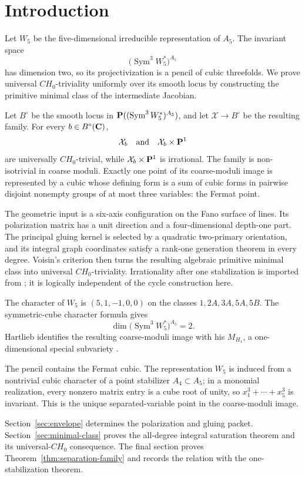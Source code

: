 \section{Introduction}

Let \(W_5\) be the five-dimensional irreducible representation of \(A_5\).
The invariant space
\[
 \bigl(\operatorname{Sym}^3W_5^*\bigr)^{A_5}
\]
has dimension two, so its projectivization is a pencil of cubic threefolds.
We prove universal \(CH_0\)-triviality uniformly over its smooth locus by
constructing the primitive minimal class of the intermediate Jacobian.

\begin{theorem}
\label{thm:separation-family}
%
%
Let \(B^\circ\) be the smooth locus in
\(\mathbf P((\operatorname{Sym}^3W_5^*)^{A_5})\), and let
\(\mathcal X\to B^\circ\) be the resulting family.  For every
\(b\in B^\circ(\mathbf C)\),
\[
 \mathcal X_b\quad\text{and}\quad\mathcal X_b\times\mathbf P^1
\]
are universally \(CH_0\)-trivial, while
\(\mathcal X_b\times\mathbf P^1\) is irrational.  The family is non-isotrivial in
coarse moduli.  Exactly one point of its coarse-moduli image is represented
by a cubic whose defining form is a sum of cubic forms in pairwise disjoint
nonempty groups of at most three variables: the Fermat point.
\end{theorem}

The geometric input is a six-axis configuration on the Fano surface of lines.
Its polarization matrix has a unit direction and a four-dimensional
depth-one part.  The principal gluing kernel is selected by a quadratic
two-primary orientation, and its integral graph coordinates satisfy a
rank-one generation theorem in every degree.  Voisin's criterion then turns
the resulting algebraic primitive minimal class into universal
\(CH_0\)-triviality.  Irrationality after one stabilization is imported from
\cite{RuddM1}; it is logically independent of the cycle construction here.

The character of \(W_5\) is \((5,1,-1,0,0)\) on the classes
\(1,2A,3A,5A,5B\).  The symmetric-cube character formula gives
\[
 \dim\bigl(\operatorname{Sym}^3W_5^*\bigr)^{A_5}=2.
\]
Hartlieb identifies the resulting coarse-moduli image with his
\(M_{H_1}\), a one-dimensional special subvariety
\cite[Lemma~5.5 and Proposition~5.7]{Hartlieb}.

\begin{remark}
\label{rem:fermat-in-pencil}
The pencil contains the Fermat cubic.  The representation \(W_5\) is induced
from a nontrivial cubic character of a point stabilizer \(A_4\subset A_5\);
in a monomial realization, every nonzero matrix entry is a cube root of
unity, so \(x_1^3+\cdots+x_5^3\) is invariant.  This is the unique
separated-variable point in the coarse-moduli image.
\end{remark}

Section~\ref{sec:envelope} determines the polarization and gluing packet.
Section~\ref{sec:minimal-class} proves the all-degree integral saturation
theorem and its universal-\(CH_0\) consequence.  The final section proves
Theorem~\ref{thm:separation-family} and records the relation with the
one-stabilization theorem.

